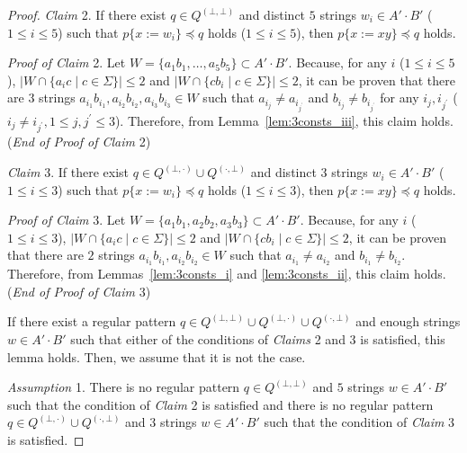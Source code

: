 \begin{proof}
\noindent
\textit{Claim} 2. If there exist $q \in Q^{(\bot,\bot)}$ and distinct $5$ strings $w_{i} \in A'\cdot B'$ ($1\leq i\leq 5$) such  that $p \{ x:=w_{i} \} \preceq q$ holds ($1\leq i\leq 5$),  then $p \{ x:=xy \} \preceq q$ holds.

\smallskip

\noindent
\textit{Proof of Claim} 2.
Let $W = \{a_{1}b_{1},\ldots,a_{5}b_{5}\} \subset A'\cdot B'$.
Because, for any $i$ ($1\leq i\leq 5$), $|W \cap \{a_{i}c \mid c \in \Sigma\}| \leq 2$ and  $|W \cap \{cb_{i} \mid c \in \Sigma\}| \leq 2$, it can be proven that there are $3$ strings $a_{i_{1}}b_{i_{1}},a_{i_{2}}b_{i_{2}},a_{i_{3}}b_{i_{3}}\in W$ such that $a_{i_{j}} \not= a_{i_{j^{\prime}}}$ and $b_{i_{j}} \not= b_{i_{j^{\prime}}}$ for any $i_{j},i_{j^{\prime}}$ ($i_{j}\not= i_{j^{\prime}}, 1\leq j,j^{\prime}\leq 3$).
Therefore, from Lemma~\ref{lem:3consts_iii}, this claim holds. (\textit{End of Proof of Claim} 2)

\smallskip

\noindent
\textit{Claim} 3. If there exist $q \in Q^{(\bot,\cdot)} \cup Q^{(\cdot,\bot)}$ and distinct $3$ strings $w_{i} \in A'\cdot B'$ ($1\leq i\leq 3$) such that $p \{ x:=w_{i} \} \preceq q$ holds ($1\leq i\leq 3$),  then $p \{ x:=xy \} \preceq q$ holds.

\noindent
\textit{Proof of Claim} 3.
Let $W = \{a_{1}b_{1},a_{2}b_{2},a_{3}b_{3}\} \subset A'\cdot B'$.
Because, for any $i$ ($1\leq i\leq 3$), $|W \cap \{a_{i}c \mid c \in \Sigma\}| \leq 2$ and  $|W \cap \{cb_{i} \mid c \in \Sigma\}| \leq 2$, it can be proven that there are $2$ strings $a_{i_{1}}b_{i_{1}},a_{i_{2}}b_{i_{2}}\in W$ such that $a_{i_{1}} \not= a_{i_{2}}$ and $b_{i_{1}} \not= b_{i_{2}}$.
Therefore, from Lemmas~\ref{lem:3consts_i} and \ref{lem:3consts_ii}, this claim holds. (\textit{End of Proof of Claim} 3)

\smallskip

\noindent
If there exist a regular pattern $q \in Q^{(\bot,\bot)} \cup Q^{(\bot,\cdot)} \cup Q^{(\cdot,\bot)}$ and enough strings $w \in A'\cdot B'$ such that either of the conditions of \textit{Claims} 2 and 3 is satisfied, this lemma holds. Then, we assume that it is not the case.

\smallskip

\noindent
\textit{Assumption} 1.
There is no regular pattern $q \in Q^{(\bot,\bot)}$ and $5$ strings $w \in A'\cdot B'$ such that the condition of \textit{Claim} 2 is satisfied and there is no regular pattern $q \in Q^{(\bot,\cdot)} \cup Q^{(\cdot,\bot)}$ and $3$ strings $w \in A'\cdot B'$ such that the condition of \textit{Claim} 3 is satisfied.


\end{proof}

